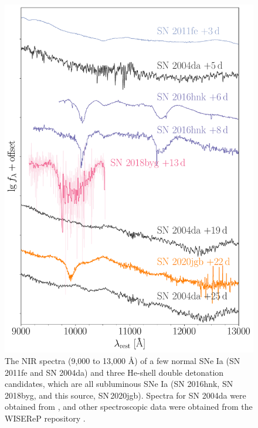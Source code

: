 \documentclass[twocolumn]{aastex631}
\newcommand\sn{SN\,2020jgb}
\begin{document}
\begin{figure}
    \centering
    \includegraphics[width=\linewidth]{NIR_spec_comp.pdf}
    \caption{The NIR spectra (9,000 to 13,000 \AA) of a few normal SNe Ia (SN 2011fe and SN 2004da) and three He-shell double detonation candidates, which are all subluminous SNe Ia (SN 2016hnk, SN 2018byg, and this source, \sn). Spectra for SN 2004da were obtained from \citet{Marion2009_NIR}, and other spectroscopic data were obtained from the WISEReP repository \citep{wiserep_2012}.}
    \label{fig:NIR_comp}
\end{figure}
\end{document}
